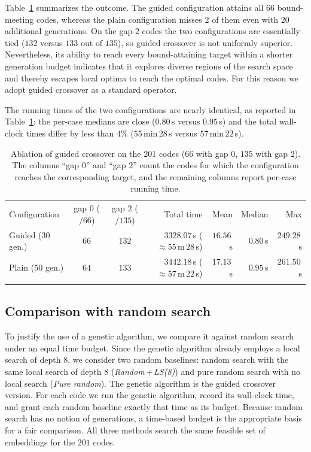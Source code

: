 \documentclass{article}
\begin{document}
Table~\ref{tab:ablation_guided} summarizes the outcome. The guided configuration attains all $66$ bound-meeting codes, whereas the plain configuration misses $2$ of them even with $20$ additional generations. On the gap-$2$ codes the two configurations are essentially tied ($132$ versus $133$ out of $135$), so guided crossover is not uniformly superior. Nevertheless, its ability to reach every bound-attaining target within a shorter generation budget indicates that it explores diverse regions of the search space and thereby escapes local optima to reach the optimal codes. For this reason we adopt guided crossover as a standard operator.

The running times of the two configurations are nearly identical, as reported in Table~\ref{tab:ablation_guided}: the per-case medians are close ($0.80$\,s versus $0.95$\,s) and the total wall-clock times differ by less than $4\%$ ($55$\,min\,$28$\,s versus $57$\,min\,$22$\,s).

\begin{table}[htbp]
\centering
\caption{Ablation of guided crossover on the $201$ codes ($66$ with gap $0$, $135$ with gap $2$). The columns ``gap $0$'' and ``gap $2$'' count the codes for which the configuration reaches the corresponding target, and the remaining columns report per-case running time.}
\label{tab:ablation_guided}
\small
\renewcommand{\arraystretch}{1.3}
\setlength{\tabcolsep}{5pt}
\begin{tabular}{l|c|c|r|r|r|r}
\Xhline{2\arrayrulewidth}
Configuration & gap $0$ ($/66$) & gap $2$ ($/135$) & Total time & Mean & Median & Max \\
\Xhline{2\arrayrulewidth}
Guided ($30$ gen.) & $66$ & $132$ & $3328.07$\,s ($\approx 55$\,m\,$28$\,s) & $16.56$\,s & $0.80$\,s & $249.28$\,s \\
\hline
Plain ($50$ gen.)  & $64$ & $133$ & $3442.18$\,s ($\approx 57$\,m\,$22$\,s) & $17.13$\,s & $0.95$\,s & $261.50$\,s \\
\Xhline{2\arrayrulewidth}
\end{tabular}
\end{table}

\subsection{Comparison with random search}
\label{sec:ga-vs-random}

To justify the use of a genetic algorithm, we compare it against random search under an equal time budget. Since the genetic algorithm already employs a local search of depth $8$, we consider two random baselines: random search with the same local search of depth $8$ (\emph{Random\,+\,LS(8)}) and pure random search with no local search (\emph{Pure random}). The genetic algorithm is the guided crossover version. For each code we run the genetic algorithm, record its wall-clock time, and grant each random baseline exactly that time as its budget. Because random search has no notion of generations, a time-based budget is the appropriate basis for a fair comparison. All three methods search the same feasible set of embeddings for the $201$ codes.
\end{document}
